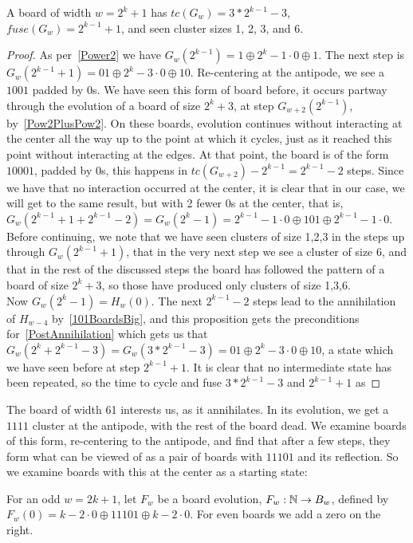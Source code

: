 \documentclass[12pt,letterpaper]{article}
\begin{document}
\begin{prop}\label{pow2Plus1Description}
  A board of width $w=2^k+1$ has $tc(G_w)=3*2^{k-1}-3$, $fuse(G_w)=2^{k-1}+1$, and seen cluster sizes 1, 2, 3, and 6.
\end{prop}
\begin{proof}
  As per~\cref{Power2} we have $G_w(2^{k-1}) = 1\oplus 2^k-1\cdot 0\oplus 1$. The next step is $G_w(2^{k-1}+1)=01\oplus 2^k-3\cdot 0\oplus 10$. Re-centering at the antipode, we see a $1001$ padded by 0s. We have seen this form of board before, it occurs partway through the evolution of a board of size $2^k+3$, at step $G_{w+2}(2^{k-1})$, by~\cref{Pow2PlusPow2}. On these boards, evolution continues without interacting at the center all the way up to the point at which it cycles, just as it reached this point without interacting at the edges. At that point, the board is of the form $10001$, padded by 0s, this happens in $tc(G_{w+2})-2^{k-1}=2^{k-1}-2$ steps. Since we have that no interaction occurred at the center, it is clear that in our case, we will get to the same result, but with 2 fewer 0s at the center, that is, $G_w(2^{k-1}+1+2^{k-1}-2) = G_w(2^k-1)=2^{k-1}-1\cdot 0 \oplus 101\oplus 2^{k-1}-1\cdot 0$. \\
  Before continuing, we note that we have seen clusters of size 1,2,3 in the steps up through $G_w(2^{k-1}+1)$, that in the very next step we see a cluster of size 6, and that in the rest of the discussed steps the board has followed the pattern of a board of size $2^k+3$, so those have produced only clusters of size 1,3,6. \\
  Now $G_w(2^k-1)=H_w(0)$. The next $2^{k-1}-2$ steps lead to the annihilation of $H_{w-4}$ by~\cref{101BoardsBig}, and this proposition gets the preconditions for~\cref{PostAnnihilation} which gets us that $G_w(2^k+2^{k-1}-3)=G_w(3*2^{k-1}-3)=01\oplus 2^k-3\cdot 0\oplus 10$, a state which we have seen before at step $2^{k-1}+1$. It is clear that no intermediate state has been repeated, so the time to cycle and fuse $3*2^{k-1}-3$ and $2^{k-1}+1$ as 
\end{proof}

The board of width 61 interests us, as it annihilates. In its evolution, we get a $1111$ cluster at the antipode, with the rest of the board dead. We examine boards of this form, re-centering to the antipode, and find that after a few steps, they form what can be viewed of as a pair of boards with $11101$ and its reflection. So we examine boards with this at the center as a starting state:
\begin{dfn}\label{11101Boards}
  For an odd $w=2k+1$, let $F_w$ be a board evolution, $F_w:\mathbb{N}\rightarrow B_w$, defined by $F_w(0) = k-2\cdot 0 \oplus 11101 \oplus k-2\cdot 0$. For even boards we add a zero on the right.
\end{dfn}
\end{document}
